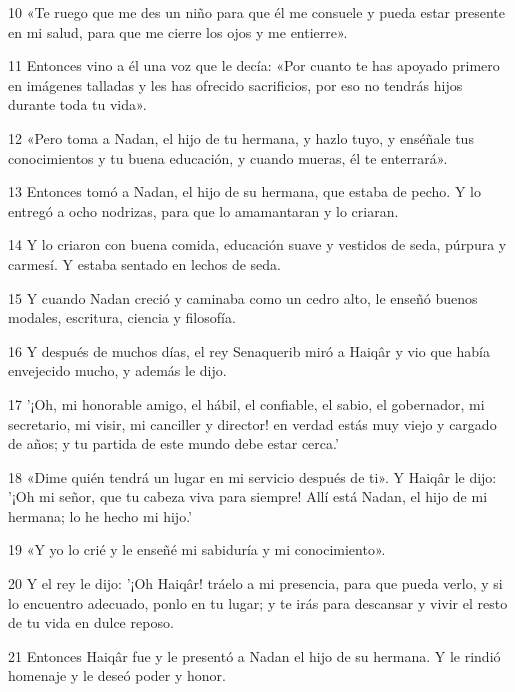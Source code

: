 \par 10 «Te ruego que me des un niño para que él me consuele y pueda estar presente en mi salud, para que me cierre los ojos y me entierre».

\par 11 Entonces vino a él una voz que le decía: «Por cuanto te has apoyado primero en imágenes talladas y les has ofrecido sacrificios, por eso no tendrás hijos durante toda tu vida».

\par 12 «Pero toma a Nadan, el hijo de tu hermana, y hazlo tuyo, y enséñale tus conocimientos y tu buena educación, y cuando mueras, él te enterrará».

\par 13 Entonces tomó a Nadan, el hijo de su hermana, que estaba de pecho. Y lo entregó a ocho nodrizas, para que lo amamantaran y lo criaran.

\par 14 Y lo criaron con buena comida, educación suave y vestidos de seda, púrpura y carmesí. Y estaba sentado en lechos de seda.

\par 15 Y cuando Nadan creció y caminaba como un cedro alto, le enseñó buenos modales, escritura, ciencia y filosofía.

\par 16 Y después de muchos días, el rey Senaquerib miró a Haiqâr y vio que había envejecido mucho, y además le dijo.

\par 17 '¡Oh, mi honorable amigo, el hábil, el confiable, el sabio, el gobernador, mi secretario, mi visir, mi canciller y director! en verdad estás muy viejo y cargado de años; y tu partida de este mundo debe estar cerca.'

\par 18 «Dime quién tendrá un lugar en mi servicio después de ti». Y Haiqâr le dijo: '¡Oh mi señor, que tu cabeza viva para siempre! Allí está Nadan, el hijo de mi hermana; lo he hecho mi hijo.'

\par 19 «Y yo lo crié y le enseñé mi sabiduría y mi conocimiento».

\par 20 Y el rey le dijo: '¡Oh Haiqâr! tráelo a mi presencia, para que pueda verlo, y si lo encuentro adecuado, ponlo en tu lugar; y te irás para descansar y vivir el resto de tu vida en dulce reposo.

\par 21 Entonces Haiqâr fue y le presentó a Nadan el hijo de su hermana. Y le rindió homenaje y le deseó poder y honor.

